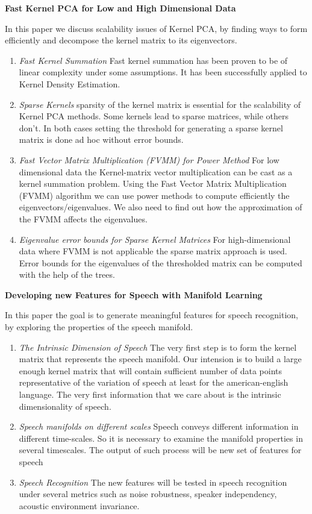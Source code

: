 \documentclass[times, 12pt,onecolumn]{article}
\begin{document}
\begin{center}
    \textbf{Fast Kernel PCA for Low and High Dimensional Data}
\end{center}
In this paper we discuss scalability issues of Kernel PCA, by finding ways to form efficiently and decompose the kernel matrix to its eigenvectors.
\begin{enumerate}
  \item \textit{Fast Kernel Summation} Fast kernel summation has been proven to be of linear complexity under some assumptions. It has been successfully applied to Kernel Density Estimation. 
  \item \textit{Sparse Kernels} sparsity of the kernel matrix is essential for the scalability of Kernel PCA methods. Some kernels lead to sparse matrices, while others don't. In both cases setting the threshold for generating a sparse kernel matrix is done ad hoc without error bounds.
  \item \textit{Fast Vector Matrix Multiplication (FVMM) for Power Method} For low dimensional data the Kernel-matrix vector multiplication can be cast as a kernel summation problem. Using the Fast Vector Matrix Multiplication (FVMM) algorithm we can use power methods to compute efficiently the eigenvectors/eigenvalues. We also need to find out how the approximation of the FVMM affects the eigenvalues.
  \item \textit{Eigenvalue error bounds for Sparse Kernel Matrices} For high-dimensional data where FVMM is not applicable the sparse matrix approach is used. Error bounds for the eigenvalues of the thresholded matrix can be computed with the help of the trees.  
\end{enumerate}

\newpage
\begin{center}
    \textbf{Developing new Features for Speech with Manifold Learning}
\end{center}
  In this paper the goal is to generate meaningful features for speech recognition, by exploring the properties of the speech manifold.
\begin{enumerate}
  \item \textit{The Intrinsic Dimension of Speech} The very first step is to form the kernel matrix that represents the speech manifold. Our intension is to build a large enough kernel matrix that will contain sufficient number of data points representative of the variation of speech at least for the american-english language. The very first information that we care about is the intrinsic dimensionality of speech.
  \item \textit{Speech manifolds on different scales} Speech conveys different information in different time-scales. So it is necessary to examine the manifold properties in several timescales. The output of such process will be new set of features for speech
  \item \textit{Speech Recognition} The new features will be tested in speech recognition under several metrics such as noise robustness, speaker independency, acoustic environment invariance. 
\end{enumerate}
\end{document}
